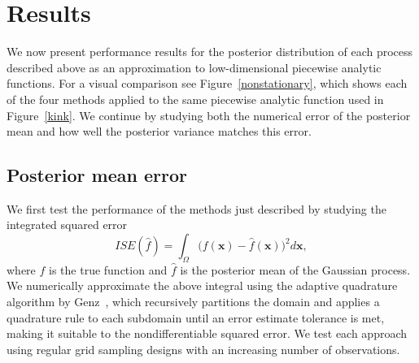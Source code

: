 \documentclass{article}
\renewcommand{\vec}[1]{\mathbf{#1}}
\numberwithin{equation}{section}
\begin{document}
\section{Results}
We now present performance results for the posterior distribution of each process described above as an approximation to low-dimensional piecewise analytic functions. For a visual comparison see Figure~\ref{nonstationary}, which shows each of the four methods applied to the same piecewise analytic function used in Figure~\ref{kink}. We continue by studying both the numerical error of the posterior mean and how well the posterior variance matches this error.

\subsection{Posterior mean error}
We first test the performance of the methods just described by studying the integrated squared error
$$ ISE(\hat{f}) = \int_\Omega \Big(f(\vec{x})- \hat{f}(\vec{x})\Big)^2 d\vec{x}, $$
where $f$ is the true function and $\hat{f}$ is the posterior mean of the Gaussian process. We numerically approximate the above integral using the adaptive quadrature algorithm by Genz~\cite{genz1991adaptive}, which recursively partitions the domain and applies a quadrature rule to each subdomain until an error estimate tolerance is met, making it suitable to the nondifferentiable squared error. We test each approach using regular grid sampling designs with an increasing number of observations.
\end{document}
